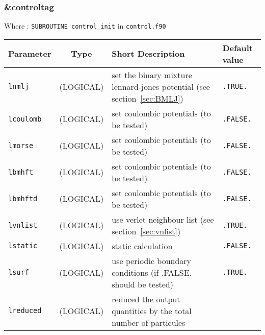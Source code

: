 \documentclass[a4paper]{article}
\begin{document}
\subsubsection{\&controltag }

Where : \verb?SUBROUTINE control_init? in \verb?control.f90?
\newline

\begin{longtable}{l|c|m{8cm}|m{2cm}}
\hline
\hline
Parameter        &  Type              &          Short Description                                                          & Default value \\
\hline
\hline
\rule[-0.75cm]{0cm}{1.5cm}
\verb?lnmlj?     & (LOGICAL)          &  set the binary mixture lennard-jones potential (see section~\ref{sec:BMLJ})        & \verb?.TRUE.?  \\
\hline
\rule[-0.75cm]{0cm}{1.5cm}
\verb?lcoulomb?  & (LOGICAL)          &  set coulombic potentials (to be tested)                                            & \verb?.FALSE.? \\
\hline
\rule[-0.75cm]{0cm}{1.5cm}
\verb?lmorse?    & (LOGICAL)          &  set coulombic potentials (to be tested)                                            & \verb?.FALSE.? \\
\hline
\rule[-0.75cm]{0cm}{1.5cm}
\verb?lbmhft?    & (LOGICAL)          &  set coulombic potentials (to be tested)                                            & \verb?.FALSE.? \\
\hline
\rule[-0.75cm]{0cm}{1.5cm}
\verb?lbmhftd?   & (LOGICAL)          &  set coulombic potentials (to be tested)                                            & \verb?.FALSE.? \\
\hline
\rule[-0.75cm]{0cm}{1.5cm}
\verb?lvnlist?   & (LOGICAL)          &  use verlet neighbour list (see section~\ref{sec:vnlist})                           & \verb?.TRUE.?  \\
\hline
\rule[-0.75cm]{0cm}{1.5cm}
\verb?lstatic?   & (LOGICAL)          &  static calculation                                                                 & \verb?.FALSE.? \\
\hline
\rule[-0.75cm]{0cm}{1.5cm}
\verb?lsurf?     & (LOGICAL)          &  use periodic boundary conditions (if .FALSE. should be tested)                     & \verb?.TRUE.?  \\
\hline
\rule[-0.75cm]{0cm}{1.5cm}
\verb?lreduced?  & (LOGICAL)          &  \newline reduced the output quantities by the total number of particules \newline


\end{longtable}
\end{document}
